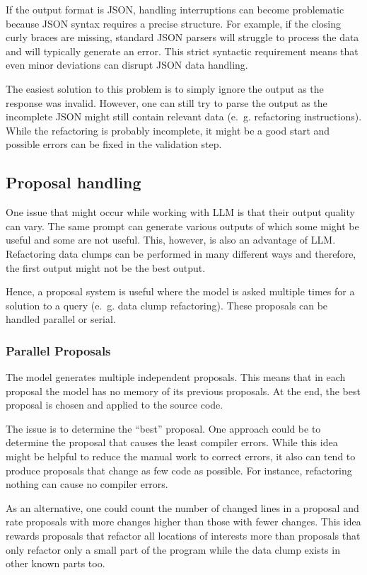 If the output format is \ac{JSON}, handling interruptions can become problematic because \ac{JSON} syntax requires a precise structure. For example, if the closing curly braces are missing, standard \ac{JSON} parsers will struggle to process the data and will typically generate an error. This strict syntactic requirement means that even minor deviations can disrupt \ac{JSON} data handling.

The easiest solution to this problem is to simply ignore the output as the response was invalid. 
However,  one can still try to parse the output as the incomplete \ac{JSON} might still contain relevant data (e.~g. refactoring instructions). While the refactoring is probably incomplete, it might be a good start and possible errors can be fixed in the validation step.


\subsection{Proposal handling}\label{sec:proposal_handling}

One issue that might occur while working with \ac{LLM} is that their output quality can vary. The same prompt can generate various outputs of which some might be useful and some are not useful. This, however, is also an advantage of \acs{LLM}. Refactoring data clumps can be performed in many different ways and therefore, the first output might not be the best output. 

Hence, a proposal system is useful where the model is asked multiple times for a solution to a query (e.~g. data clump refactoring). These proposals can be handled parallel or serial.  

\subsubsection{Parallel Proposals}
The model generates multiple independent proposals. This means that in each proposal the model has no memory of its previous proposals. At the end, the best proposal is chosen and applied to the source code.

The issue is to determine the \enquote{best} proposal. One approach could be to determine the proposal that causes the least compiler errors. While this idea might be helpful to reduce the manual work to correct errors, it also can tend to produce proposals that change as few code as possible. For instance, refactoring nothing can cause no compiler errors.

As an alternative, one could count the number of changed lines in a proposal and rate proposals with more changes higher than those with fewer changes. This idea rewards proposals that refactor all locations of interests more than proposals that only refactor only a small part of the program while the data clump exists in other known parts too. 


